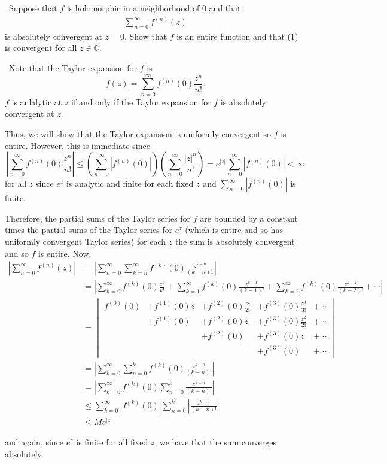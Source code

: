 \documentclass[12pt]{Qual}
\begin{document}
\begin{problem} $\,$
Suppose that $f$ is holomorphic in a neighborhood of $0$ and that \begin{align*}
    \sum_{n=0}^\infty f^{(n)}(z) \tag{1}
\end{align*} is absolutely convergent at $z=0$. Show that $f$ is an entire function and that (1) is convergent for all $z\in\mathbb{C}$.
\end{problem}


\begin{solution}$\,$
Note that the Taylor expansion for $f$ is $$f(z)=\sum_{n=0}^\infty f^{(n)}(0)\frac{z^n}{n!}.$$ $f$ is anlalytic at $z$ if and only if the Taylor expansion for $f$ is absolutely convergent at $z.$

Thus, we will show that the Taylor expansion is uniformly convergent so $f$ is entire. However, this is immediate since $$\left|\sum_{n=0}^\infty f^{(n)}(0)\frac{z^n}{n!}\right|\le\left(\sum_{n=0}^\infty|f^{(n)}(0)|\right)\left(\sum_{n=0}^\infty\frac{|z|^n}{n!}\right)=e^{|z|}\sum_{n=0}^\infty|f^{(n)}(0)|<\infty$$ for all $z$ since $e^z$ is analytic and finite for each fixed $z$ and $\sum_{n=0}^\infty|f^{(n)}(0)|$ is finite.

Therefore, the partial sums of the Taylor series for $f$ are bounded by a constant times the partial sums of the Taylor series for $e^z$ (which is entire and so has uniformly convergent Taylor series) for each $z$ the sum is absolutely convergent and so $f$ is entire. Now, \begin{align*}
    \left|\sum_{n=0}^\infty f^{(n)}(z)\right|&=\left|\sum_{n=0}^\infty\sum_{k=n}^\infty f^{(k)}(0)\frac{z^{k-n}}{(k-n)1}\right|\\
    &=\left|\sum_{k=0}^\infty f^{(k)}(0)\frac{z^k}{k!}+\sum_{k=1}^\infty f^{(k)}(0)\frac{z^{k-1}}{(k-1)!}+\sum_{k=2}^\infty f^{(k)}(0)\frac{z^{k-2}}{(k-2)!}+\cdots\right|\\
    &=\begin{vmatrix}
    f^{(0)}(0) & + f^{(1)}(0)z & + f^{(2)}(0)\frac{z^2}{2!} & + f^{(3)}(0)\frac{z^3}{3!} &+\cdots\\
    & + f^{(1)}(0) & + f^{(2)}(0)z & + f^{(3)}(0)\frac{z^2}{2!} & +\cdots\\
    & & +f^{(2)}(0) & + f^{(3)}(0)z &+\cdots \\
    & & & + f^{(3)}(0) & +\cdots
    \end{vmatrix}\\
    &=\left|\sum_{k=0}^\infty\sum_{n=0}^kf^{(k)}(0)\frac{z^{k-n}}{(k-n)!}\right|\\
    &=\left|\sum_{k=0}^\infty f^{(k)}(0)\sum_{n=0}^k\frac{z^{k-n}}{(k-n)!}\right|\\
    &\le \sum_{k=0}^\infty|f^{(k)}(0)|\sum_{n=0}^k\left|\frac{z^{k-n}}{(k-n)!}\right|\\
    &\le M e^{|z|}
\end{align*}

and again, since $e^z$ is finite for all fixed $z$, we have that the sum converges absolutely.
\end{solution}
\newpage
\end{document}
